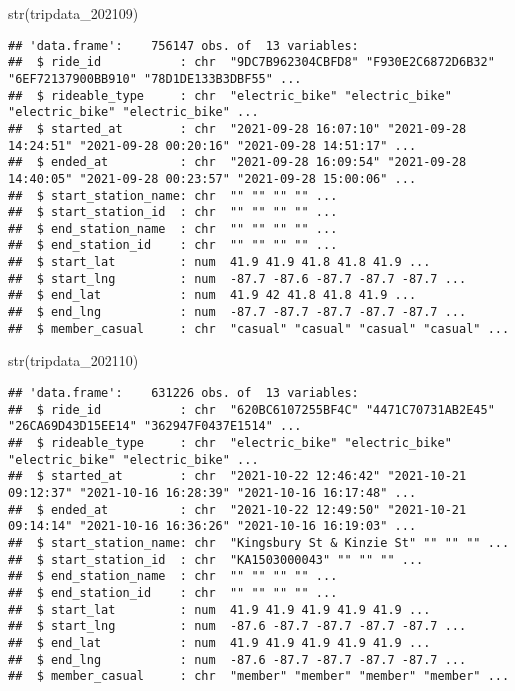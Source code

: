\documentclass[
]{article}
\newenvironment{Shaded}{\begin{snugshade}}{\end{snugshade}}
\newcommand{\FunctionTok}[1]{\textcolor[rgb]{0.00,0.00,0.00}{#1}}
\newcommand{\NormalTok}[1]{#1}
\begin{document}
\begin{Shaded}
\begin{Highlighting}[]
\FunctionTok{str}\NormalTok{(tripdata\_202109)}
\end{Highlighting}
\end{Shaded}

\begin{verbatim}
## 'data.frame':    756147 obs. of  13 variables:
##  $ ride_id           : chr  "9DC7B962304CBFD8" "F930E2C6872D6B32" "6EF72137900BB910" "78D1DE133B3DBF55" ...
##  $ rideable_type     : chr  "electric_bike" "electric_bike" "electric_bike" "electric_bike" ...
##  $ started_at        : chr  "2021-09-28 16:07:10" "2021-09-28 14:24:51" "2021-09-28 00:20:16" "2021-09-28 14:51:17" ...
##  $ ended_at          : chr  "2021-09-28 16:09:54" "2021-09-28 14:40:05" "2021-09-28 00:23:57" "2021-09-28 15:00:06" ...
##  $ start_station_name: chr  "" "" "" "" ...
##  $ start_station_id  : chr  "" "" "" "" ...
##  $ end_station_name  : chr  "" "" "" "" ...
##  $ end_station_id    : chr  "" "" "" "" ...
##  $ start_lat         : num  41.9 41.9 41.8 41.8 41.9 ...
##  $ start_lng         : num  -87.7 -87.6 -87.7 -87.7 -87.7 ...
##  $ end_lat           : num  41.9 42 41.8 41.8 41.9 ...
##  $ end_lng           : num  -87.7 -87.7 -87.7 -87.7 -87.7 ...
##  $ member_casual     : chr  "casual" "casual" "casual" "casual" ...
\end{verbatim}

\begin{Shaded}
\begin{Highlighting}[]
\FunctionTok{str}\NormalTok{(tripdata\_202110)}
\end{Highlighting}
\end{Shaded}

\begin{verbatim}
## 'data.frame':    631226 obs. of  13 variables:
##  $ ride_id           : chr  "620BC6107255BF4C" "4471C70731AB2E45" "26CA69D43D15EE14" "362947F0437E1514" ...
##  $ rideable_type     : chr  "electric_bike" "electric_bike" "electric_bike" "electric_bike" ...
##  $ started_at        : chr  "2021-10-22 12:46:42" "2021-10-21 09:12:37" "2021-10-16 16:28:39" "2021-10-16 16:17:48" ...
##  $ ended_at          : chr  "2021-10-22 12:49:50" "2021-10-21 09:14:14" "2021-10-16 16:36:26" "2021-10-16 16:19:03" ...
##  $ start_station_name: chr  "Kingsbury St & Kinzie St" "" "" "" ...
##  $ start_station_id  : chr  "KA1503000043" "" "" "" ...
##  $ end_station_name  : chr  "" "" "" "" ...
##  $ end_station_id    : chr  "" "" "" "" ...
##  $ start_lat         : num  41.9 41.9 41.9 41.9 41.9 ...
##  $ start_lng         : num  -87.6 -87.7 -87.7 -87.7 -87.7 ...
##  $ end_lat           : num  41.9 41.9 41.9 41.9 41.9 ...
##  $ end_lng           : num  -87.6 -87.7 -87.7 -87.7 -87.7 ...
##  $ member_casual     : chr  "member" "member" "member" "member" ...
\end{verbatim}
\end{document}
